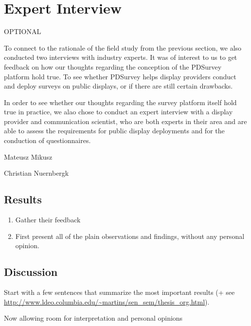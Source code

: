 \section{Expert Interview}

OPTIONAL

To connect to the rationale of the field study from the previous section, we also conducted two interviews with industry experts. It was of interest to us to get feedback on how our thoughts regarding the conception of the PDSurvey platform hold true. To see whether PDSurvey helps display providers conduct and deploy surveys on public displays, or if there are still certain drawbacks.

In order to see whether our thoughts regarding the survey platform itself hold true in practice, we alao chose to conduct an expert interview with a display provider and communication scientist, who are both experts in their area and are able to assess the requirements for public display deployments and for the conduction of questionnaires.


Mateusz Mikusz


Christian Nuernbergk



\subsection{Results}

	\begin{enumerate}
	\item Gather their feedback
	\item First present all of the plain observations and findings, without any personal opinion.
	\end{enumerate}



\subsection{Discussion}

	Start with a few sentences that summarize the most important results (+ see \url{http://www.ldeo.columbia.edu/~martins/sen_sem/thesis_org.html}).

	Now allowing room for interpretation and personal opinions

